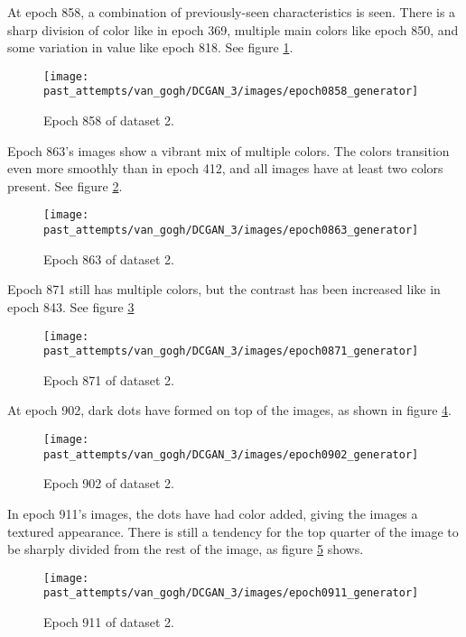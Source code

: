 \documentclass[11pt,letterpaper]{article}
\begin{document}
				At epoch 858, a combination of previously-seen characteristics is seen.
				There is a sharp division of color like in epoch 369, multiple main colors like epoch 850, and some variation in value like epoch 818.
				See figure \ref{fig:cgvg:epoch0858generator}.
				\begin{figure}
					\centering
					\texttt{[image: past\_attempts/van\_gogh/DCGAN\_3/images/epoch0858\_generator]}
					\caption{Epoch 858 of dataset 2.}
					\label{fig:cgvg:epoch0858generator}
				\end{figure}

				Epoch 863's images show a vibrant mix of multiple colors.
				The colors transition even more smoothly than in epoch 412, and all images have at least two colors present.
				See figure \ref{fig:cgvg:epoch0863generator}.
				\begin{figure}
					\centering
					\texttt{[image: past\_attempts/van\_gogh/DCGAN\_3/images/epoch0863\_generator]}
					\caption{Epoch 863 of dataset 2.}
					\label{fig:cgvg:epoch0863generator}
				\end{figure}

				Epoch 871 still has multiple colors, but the contrast has been increased like in epoch 843.
				See figure \ref{fig:cgvg:epoch0871generator}
				\begin{figure}
					\centering
					\texttt{[image: past\_attempts/van\_gogh/DCGAN\_3/images/epoch0871\_generator]}
					\caption{Epoch 871 of dataset 2.}
					\label{fig:cgvg:epoch0871generator}
				\end{figure}

				At epoch 902, dark dots have formed on top of the images, as shown in figure \ref{fig:cgvg:epoch0902generator}.
				\begin{figure}
					\centering
					\texttt{[image: past\_attempts/van\_gogh/DCGAN\_3/images/epoch0902\_generator]}
					\caption{Epoch 902 of dataset 2.}
					\label{fig:cgvg:epoch0902generator}
				\end{figure}

				In epoch 911's images, the dots have had color added, giving the images a textured appearance.
				There is still a tendency for the top quarter of the image to be sharply divided from the rest of the image, as figure \ref{fig:cgvg:epoch0911generator} shows.
				\begin{figure}
					\centering
					\texttt{[image: past\_attempts/van\_gogh/DCGAN\_3/images/epoch0911\_generator]}
					\caption{Epoch 911 of dataset 2.}
					\label{fig:cgvg:epoch0911generator}
				\end{figure}
\end{document}
